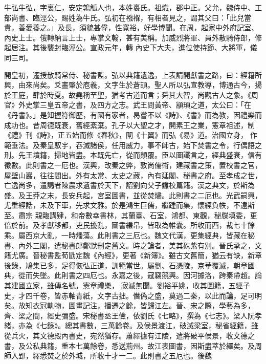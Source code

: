 
\begin{pinyinscope}

 牛弘牛弘，字裏仁，安定鶉觚人也，本姓裛氏。祖熾，郡中正。父允，魏侍中、工部尚書、臨涇公，賜姓為牛氏。弘初在襁褓，有相者見之，謂其父曰：「此兒當貴，善愛養之。」及長，須貌甚偉，性寬裕，好學博聞。在周，起家中外府記室、內史上士。俄轉納言上士，專掌文翰，甚有美稱。加威烈將軍、員外散騎侍郎，修起居注。其後襲封臨涇公。宣政元年，轉
 內史下大夫，進位使持節、大將軍，儀同三司。



 開皇初，遷授散騎常侍、秘書監。弘以典籍遺逸，上表請開獻書之路，曰：經籍所興，由來尚矣。爻畫肇於庖羲，文字生於蒼頡。聖人所以弘宣教導，博通古今，揚於王庭，肆於時夏。故堯稱至聖，猶考古道而言；舜其大智，尚觀古人之象。《周官》外史掌三皇五帝之書，及四方之志。武王問黃帝、顓頊之道，太公曰：「在《丹書》。」是知握符御歷，有國有家者，曷嘗不以《詩》、《書》而為教，因禮樂而成功也。昔周德既衰，舊經紊棄。孔子以大聖之才，開素王之業，憲章祖述，制《禮》刊《詩》，正五始而修《春秋》，闡《十翼》而弘《易》道。治國立身，
 作範垂法。及秦皇馭宇，吞滅諸侯，任用威力，事不師古，始下焚書之令，行偶語之刑。先王墳籍，掃地皆盡。本既先亡，從而顛覆。臣以圖讖言之，經典盛衰，信有徵數。此則書之一厄也。漢興，改秦之弊，敦尚儒術，建藏書之策，置校書之官，屋壁山巖，往往間出。外有太常、太史之藏，內有延閣、秘書之府。至孝成之世，亡逸尚多，遣謁者陳農求遺書於天下，詔劉向父子讎校篇籍。漢之典文，於斯為盛。及王莽之末，長安兵起，宮室圖書，並從焚燼。此則書之二厄也。光武嗣興，尤重經誥，未及下車，先求文雅。於是鴻生巨儒，繼踵而集，懷經負帙，不遠斯至。肅宗
 親臨講肄，和帝數幸書林，其蘭臺、石室，鴻都、東觀，秘牒填委，更倍於前。及孝獻移都，吏民擾亂，圖書縑帛，皆取為帷囊。所收而西，裁七十餘乘。屬西京大亂，一時燔蕩。此則書之三厄也。魏文代漢，更集經典，皆藏在秘書、內外三閣，遣秘書郎鄭默刪定舊文。時之論者，美其硃紫有別。晉氏承之，文籍尤廣。晉秘書監荀勖定魏《內經》，更著《新簿》。雖古文舊簡，猶云有缺，新章後錄，鳩集已多，足得恢弘正道，訓範當世。屬劉、石憑陵，京華覆滅，朝章國典，從而失墜。此則書之四厄也。永嘉之後，寇竊競興。因河據洛，跨秦帶趙。論其建國立家，雖傳名號，憲章禮樂，
 寂滅無聞。劉裕平姚，收其圖籍，五經子史，才四千卷，皆赤軸青紙，文字古拙。僭偽之盛，莫過二秦，以此而論，足可明矣。故知衣冠軌物，圖畫記注，播遷之餘，皆歸江左。晉、宋之際，學藝為多，齊、梁之間，經史彌盛。宋秘書丞王儉，依劉氏《七略》，撰為《七志》。梁人阮孝緒，亦為《七錄》。總其書數，三萬餘卷。及侯景渡江，破滅梁室，秘省經籍，雖從兵火，其文德殿內書史，宛然猶存。蕭繹據有江陵，遣將破平侯景，收文德之書，及公私典籍，重本七萬餘卷，悉送荊州。故江表圖書，因斯盡萃於繹矣。及周師入郢，繹悉焚之於外城，所收十才一二。此則書之五厄也。後魏

\end{pinyinscope}
